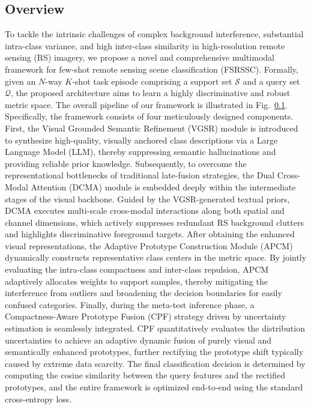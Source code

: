 \documentclass[lettersize,journal]{IEEEtran}
\begin{document}
\subsection{Overview}
To tackle the intrinsic challenges of complex background interference, substantial intra-class variance, and high inter-class similarity in high-resolution remote sensing (RS) imagery, we propose a novel and comprehensive multimodal framework for few-shot remote sensing scene classification (FSRSSC). 
Formally, given an $N$-way $K$-shot task episode comprising a support set $\mathcal{S}$ and a query set $\mathcal{Q}$, the proposed architecture aims to learn a highly discriminative and robust metric space. 
The overall pipeline of our framework is illustrated in Fig.~\ref{}.
Specifically, the framework consists of four meticulously designed components. 
First, the Visual Grounded Semantic Refinement (VGSR) module is introduced to synthesize high-quality, visually anchored class descriptions via a Large Language Model (LLM), thereby suppressing semantic hallucinations and providing reliable prior knowledge. 
Subsequently, to overcome the representational bottlenecks of traditional late-fusion strategies, the Dual Cross-Modal Attention (DCMA) module is embedded deeply within the intermediate stages of the visual backbone. 
Guided by the VGSR-generated textual priors, DCMA executes multi-scale cross-modal interactions along both spatial and channel dimensions, which actively suppresses redundant RS background clutters and highlights discriminative foreground targets. 
After obtaining the enhanced visual representations, the Adaptive Prototype Construction Module (APCM) dynamically constructs representative class centers in the metric space. 
By jointly evaluating the intra-class compactness and inter-class repulsion, APCM adaptively allocates weights to support samples, thereby mitigating the interference from outliers and broadening the decision boundaries for easily confused categories. 
Finally, during the meta-test inference phase, a Compactness-Aware Prototype Fusion (CPF) strategy driven by uncertainty estimation is seamlessly integrated. 
CPF quantitatively evaluates the distribution uncertainties to achieve an adaptive dynamic fusion of purely visual and semantically enhanced prototypes, further rectifying the prototype shift typically caused by extreme data scarcity. 
The final classification decision is determined by computing the cosine similarity between the query features and the rectified prototypes, and the entire framework is optimized end-to-end using the standard cross-entropy loss.
\end{document}
